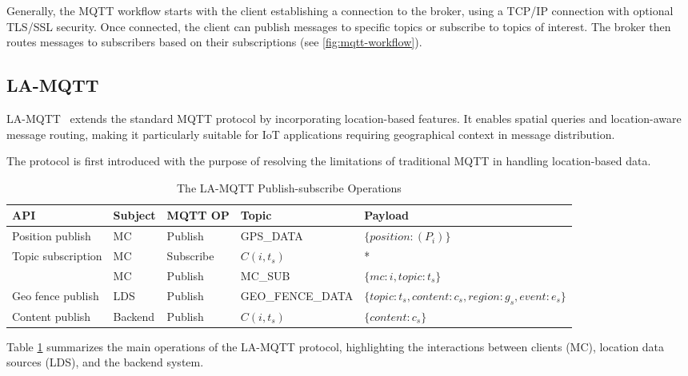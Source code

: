 Generally, the MQTT workflow starts with the client establishing a connection to the broker, using a TCP/IP connection with optional TLS/SSL security. Once connected, the client can publish messages to specific topics or subscribe to topics of interest. The broker then routes messages to subscribers based on their subscriptions (see \cref{fig:mqtt-workflow}).

\subsection{LA-MQTT} \label{sec:la-mqtt}
LA-MQTT~\cite{montori2022lamqtt} extends the standard MQTT protocol by incorporating location-based features. It enables spatial queries and location-aware message routing, making it particularly suitable for IoT applications requiring geographical context in message distribution.

The protocol is first introduced with the purpose of resolving the limitations of traditional MQTT in handling location-based data.

\begin{table}[h]
\small
\begin{tabularx}{\linewidth}{|l|X|X|X|p{4cm}|}
\hline
\textbf{API} & \textbf{Subject} & \textbf{MQTT OP} & \textbf{Topic} & \textbf{Payload} \\ \hline
Position publish & MC & Publish & GPS\_DATA & $\{position: ( P_i )\}$ \\ \hline
Topic subscription & MC & Subscribe & $C(i, t_s)$ & * \\ \cline{2-5}
 & MC & Publish & MC\_SUB & $\{ mc: i, topic: t_s \}$ \\ \hline
Geo fence publish & LDS & Publish & GEO\_FENCE\_DATA & $\{topic: t_s, content: c_s, $\newline$region: g_s, event: e_s\}$ \\ \hline
Content publish & Backend & Publish & $C(i, t_s)$ & $\{content: c_s\}$ \\ \hline
\end{tabularx}
\caption{The LA-MQTT Publish-subscribe Operations}
\label{table:la-mqtt}
\end{table}

Table \ref{table:la-mqtt} summarizes the main operations of the LA-MQTT protocol, highlighting the interactions between clients (MC), location data sources (LDS), and the backend system.

